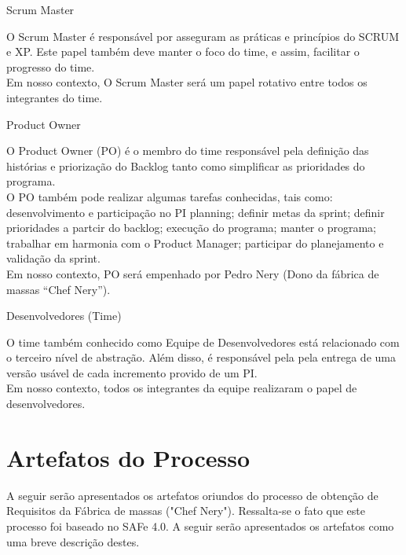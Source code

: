 \begin{itemize}
{
\large{\item {Scrum Master\\} }
	\tab O Scrum Master é responsável por asseguram as práticas e princípios do SCRUM e XP. Este papel também deve manter o foco do time, e assim, facilitar o progresso do time. \\
	\tab Em nosso contexto, O Scrum Master será um papel rotativo entre todos os integrantes do time. \\
}

{
	\large{\item {Product Owner\\} }

	\tab O Product Owner (PO) é o membro do time responsável pela definição das histórias e priorização do Backlog tanto como simplificar as prioridades do programa. \\
	\tab O PO também pode realizar algumas tarefas conhecidas, tais como: desenvolvimento e participação no PI planning; definir metas da sprint; definir prioridades  a partcir do backlog; execução do programa; manter o programa; trabalhar em harmonia com o Product Manager; participar do planejamento e validação da sprint. \\
	\tab Em nosso contexto, PO será empenhado por Pedro Nery (Dono da fábrica de massas “Chef Nery”). \\
}

{
	\large{\item {Desenvolvedores (Time)\\} }

	\tab O time também conhecido como Equipe de Desenvolvedores está relacionado com o terceiro nível de abstração. Além disso, é responsável pela pela entrega de uma versão usável de cada incremento provido de um PI. \\
	\tab Em nosso contexto, todos os integrantes da equipe realizaram o papel de desenvolvedores. \\

}

{
	\large{\section {Artefatos do Processo } }

	\tab A seguir serão apresentados os artefatos oriundos do processo de obtenção de Requisitos da Fábrica de massas ("Chef Nery"). Ressalta-se o fato que este processo foi baseado no SAFe 4.0. A seguir serão apresentados os artefatos como uma breve descrição destes. \\

}
\end{itemize}

